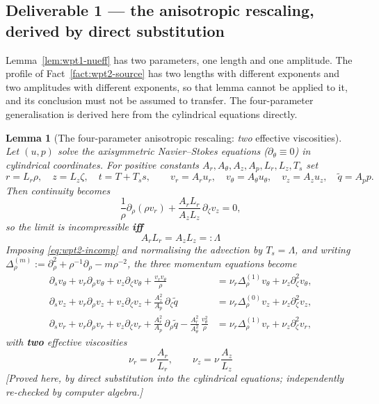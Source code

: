 \documentclass[11pt]{article}
\newtheorem{lemma}[theorem]{Lemma}
\theoremstyle{definition}
\theoremstyle{remark}
\begin{document}
\subsection{Deliverable 1 --- the anisotropic rescaling, derived by direct
substitution}
\label{subsec:wpt2-aniso}

Lemma~\ref{lem:wpt1-nueff} has two parameters, one length and one amplitude.
The profile of Fact~\ref{fact:wpt2-source} has two lengths with different
exponents and two amplitudes with different exponents, so that lemma cannot
be applied to it, and its conclusion must not be assumed to transfer. The
four-parameter generalisation is derived here from the cylindrical equations
directly.

\begin{lemma}[The four-parameter anisotropic rescaling: \emph{two} effective
  viscosities]\label{lem:wpt2-aniso}
  Let $(u,p)$ solve the axisymmetric Navier--Stokes equations
  ($\partial_\theta\equiv0$) in cylindrical coordinates. For positive
  constants $A_r,A_\theta,A_z,A_p,L_r,L_z,T_s$ set
  \[
    r=L_r\rho,\quad z=L_z\zeta,\quad t=T+T_ss,\qquad
    v_r=A_ru_r,\quad v_\theta=A_\theta u_\theta,\quad
    v_z=A_zu_z,\quad \tilde q=A_pp .
  \]
  Then continuity becomes
  \[
    \frac1\rho\partial_\rho(\rho v_r)
      +\frac{A_rL_r}{A_zL_z}\,\partial_\zeta v_z=0,
  \]
  so the limit is incompressible \textbf{iff}
  \begin{equation}\label{eq:wpt2-incomp}
    \boxed{\ A_rL_r=A_zL_z=:\Lambda\ }
  \end{equation}
  Imposing \eqref{eq:wpt2-incomp} and normalising the advection by
  $T_s=\Lambda$, and writing
  $\Delta^{(m)}_\rho:=\partial_\rho^2+\rho^{-1}\partial_\rho
   -m\rho^{-2}$, the three momentum equations become
  \begin{align}
    \partial_sv_\theta+v_r\partial_\rho v_\theta+v_z\partial_\zeta v_\theta
      +\frac{v_rv_\theta}{\rho}
      &=\nu_r\Delta^{(1)}_\rho v_\theta+\nu_z\partial_\zeta^2v_\theta,
      \label{eq:wpt2-theta}\\
    \partial_sv_z+v_r\partial_\rho v_z+v_z\partial_\zeta v_z
      +\frac{A_z^2}{A_p}\,\partial_\zeta\tilde q
      &=\nu_r\Delta^{(0)}_\rho v_z+\nu_z\partial_\zeta^2v_z,
      \label{eq:wpt2-z}\\
    \partial_sv_r+v_r\partial_\rho v_r+v_z\partial_\zeta v_r
      +\frac{A_r^2}{A_p}\,\partial_\rho\tilde q
      -\frac{A_r^2}{A_\theta^2}\,\frac{v_\theta^2}{\rho}
      &=\nu_r\Delta^{(1)}_\rho v_r+\nu_z\partial_\zeta^2v_r,
      \label{eq:wpt2-r}
  \end{align}
  with \textbf{two} effective viscosities
  \begin{equation}\label{eq:wpt2-nurz}
    \boxed{\ \nu_r=\nu\,\frac{A_r}{L_r},\qquad
             \nu_z=\nu\,\frac{A_z}{L_z}\ }
  \end{equation}
  \emph{[Proved here, by direct substitution into the cylindrical equations;
  independently re-checked by computer algebra.]}
\end{lemma}
\end{document}

